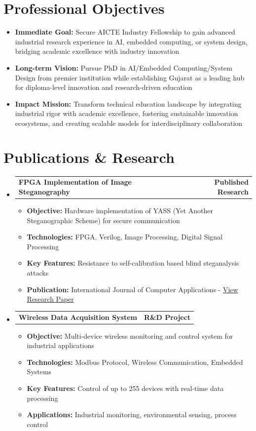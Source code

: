 \documentclass[11pt,a4paper]{article}
\makeatletter
\newcommand{\resumeItem}[1]{
    \item\small{#1 \vspace{-1pt}}
}
\newcommand{\resumeProjectHeading}[2]{
    \vspace{-1pt}\item
    \begin{tabular*}{0.97\textwidth}{l@{\extracolsep{\fill}}r}
        \small\textbf{\color{secondary}#1} & \textbf{\color{mediumgray}\small #2} \\
    \end{tabular*}\vspace{-3pt}
}
\newcommand{\resumeSubHeadingListStart}{\begin{itemize}[leftmargin=0.15in, label={}]}
\newcommand{\resumeSubHeadingListEnd}{\end{itemize}}
\newcommand{\resumeItemListStart}{\begin{itemize}[leftmargin=0.3in]}
\newcommand{\resumeItemListEnd}{\end{itemize}\vspace{-4pt}}
\makeatother
\begin{document}
\section{Professional Objectives}
\small
\begin{itemize}[leftmargin=0.15in, label={}]
    \item \textbf{\color{primary}Immediate Goal:} Secure AICTE Industry Fellowship to gain advanced industrial research experience in AI, embedded computing, or system design, bridging academic excellence with industry innovation
    \item \textbf{\color{primary}Long-term Vision:} Pursue PhD in AI/Embedded Computing/System Design from premier institution while establishing Gujarat as a leading hub for diploma-level innovation and research-driven education
    \item \textbf{\color{primary}Impact Mission:} Transform technical education landscape by integrating industrial rigor with academic excellence, fostering sustainable innovation ecosystems, and creating scalable models for interdisciplinary collaboration
\end{itemize}

\section{Publications \& Research}
\resumeSubHeadingListStart

\resumeProjectHeading
{\textbf{FPGA Implementation of Image Steganography}}{Published Research}
\resumeItemListStart
\resumeItem{\textbf{Objective:} Hardware implementation of YASS (Yet Another Steganographic Scheme) for secure communication}
\resumeItem{\textbf{Technologies:} FPGA, Verilog, Image Processing, Digital Signal Processing}
\resumeItem{\textbf{Key Features:} Resistance to self-calibration based blind steganalysis attacks}
\resumeItem{\textbf{Publication:} International Journal of Computer Applications - \href{https://www.ijcaonline.org/archives/volume120/number9/21259-4125}{\textcolor{primary}{View Research Paper}}}
\resumeItemListEnd

\resumeProjectHeading
{\textbf{Wireless Data Acquisition System}}{R\&D Project}
\resumeItemListStart
\resumeItem{\textbf{Objective:} Multi-device wireless monitoring and control system for industrial applications}
\resumeItem{\textbf{Technologies:} Modbus Protocol, Wireless Communication, Embedded Systems}
\resumeItem{\textbf{Key Features:} Control of up to 255 devices with real-time data processing}
\resumeItem{\textbf{Applications:} Industrial monitoring, environmental sensing, process control}
\resumeItemListEnd

\resumeSubHeadingListEnd
\end{document}
